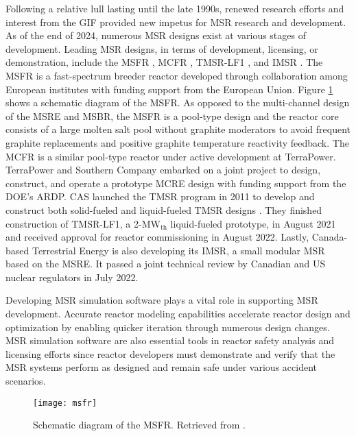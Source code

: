 Following a relative lull lasting until the late 1990s, renewed research efforts and interest from
the \gls{GIF}
provided new impetus for \gls{MSR} research and development. As of the end of 2024, numerous
\gls{MSR} designs exist at various stages of development. Leading \gls{MSR} designs, in terms of
development, licensing, or demonstration, include the \gls{MSFR} \cite{merle_optimized_2007},
\gls{MCFR} \cite{terrapower_terrapower_2021}, TMSR-LF1 \cite{zhang_review_2018}, and \gls{IMSR}
\cite{leblanc_18_2017}. The \gls{MSFR} is a fast-spectrum breeder reactor developed through
collaboration among European institutes with funding support from the
European Union. Figure \ref{fig:msfr} shows a schematic diagram of the \gls{MSFR}. As opposed to
the multi-channel design of the \gls{MSRE} and \gls{MSBR}, the \gls{MSFR} is a pool-type design and
the reactor core consists of a large molten salt pool without graphite moderators to avoid
frequent graphite replacements and positive graphite temperature reactivity feedback. The
\gls{MCFR} is a similar pool-type reactor under active development at TerraPower. TerraPower and
Southern Company embarked on a joint project to design, construct, and operate a prototype
\gls{MCRE} design with funding support from the \gls{DOE}'s \gls{ARDP}. \gls{CAS} launched the
\gls{TMSR} program in 2011 to develop and construct both solid-fueled and liquid-fueled \gls{TMSR}
designs \cite{zou_research_2019}. They finished construction of TMSR-LF1, a 2-MW$_{\text{th}}$
liquid-fueled prototype, in August 2021 and received approval for reactor commissioning in August
2022. Lastly, Canada-based Terrestrial Energy is also developing its \gls{IMSR}, a small modular
\gls{MSR} based on the \gls{MSRE}. It passed a joint technical review by
Canadian and US nuclear regulators in July 2022.

Developing \gls{MSR} simulation software plays a vital role in supporting \gls{MSR}
development. Accurate reactor modeling capabilities
accelerate reactor design and optimization by enabling quicker iteration through numerous design
changes. \gls{MSR} simulation software are also essential tools in reactor safety analysis and
licensing efforts since reactor developers must demonstrate and verify that the \gls{MSR} systems
perform as designed and remain safe under various accident scenarios. 
%
\begin{figure}[htb!]
	\centering
	\texttt{[image: msfr]}
	\caption{Schematic diagram of the \gls{MSFR}. Retrieved from 
	\cite{allibert_7_2016}.}
	\label{fig:msfr}
\end{figure}

